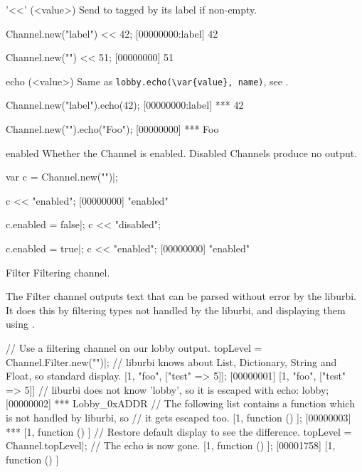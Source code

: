 \begin{urbiscriptapi}
\item['<<'](<value>)%
  Send  to \this tagged by its label if non-empty.

\begin{urbiscript}
Channel.new("label") << 42;
[00000000:label] 42

Channel.new("") << 51;
[00000000] 51
\end{urbiscript}

\item[echo](<value>)%
  Same as \lstinline|lobby.echo(\var{value}, name)|, see
  .

\begin{urbiscript}
Channel.new("label").echo(42);
[00000000:label] *** 42

Channel.new("").echo("Foo");
[00000000] *** Foo
\end{urbiscript}

\item[enabled] Whether the Channel is enabled.  Disabled Channels
  produce no output.
\begin{urbiscript}
var c = Channel.new("")|;

c << "enabled";
[00000000] "enabled"

c.enabled = false|;
c << "disabled";

c.enabled = true|;
c << "enabled";
[00000000] "enabled"
\end{urbiscript}

\item[Filter] Filtering channel.

The Filter channel outputs text that can be parsed without error by the liburbi.
It does this by filtering types not handled by the liburbi, and displaying
them using .

\begin{urbiscript}
// Use a filtering channel on our lobby output.
topLevel = Channel.Filter.new("")|;
// liburbi knows about List, Dictionary, String and Float, so standard display.
[1, "foo", ["test" => 5]];
[00000001] [1, "foo", ["test" => 5]]
// liburbi does not know 'lobby', so it is escaped with echo:
lobby;
[00000002] *** Lobby_0xADDR
// The following list contains a function which is not handled by liburbi, so
// it gets escaped too.
[1, function () {}];
[00000003] *** [1, function () {}]
// Restore default display to see the difference.
topLevel = Channel.topLevel|;
// The echo is now gone.
[1, function () {}];
[00001758] [1, function () {}]
\end{urbiscript}


\end{urbiscriptapi}
